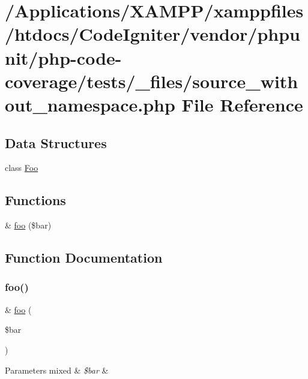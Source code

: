 \hypertarget{source__without__namespace_8php}{}\section{/\+Applications/\+X\+A\+M\+P\+P/xamppfiles/htdocs/\+Code\+Igniter/vendor/phpunit/php-\/code-\/coverage/tests/\+\_\+files/source\+\_\+without\+\_\+namespace.php File Reference}
\label{source__without__namespace_8php}
\subsection*{Data Structures}
\begin{DoxyCompactItemize}
\item 
class \mbox{\hyperlink{class_foo}{Foo}}
\end{DoxyCompactItemize}
\subsection*{Functions}
\begin{DoxyCompactItemize}
\item 
\& \mbox{\hyperlink{source__without__namespace_8php_ad7cf84e3c094f652ef0e0287d42393b1}{foo}} (\$bar)
\end{DoxyCompactItemize}


\subsection{Function Documentation}
\mbox{\label{source__without__namespace_8php_ad7cf84e3c094f652ef0e0287d42393b1}} 
\subsubsection{\texorpdfstring{foo()}{foo()}}
{\footnotesize\ttfamily \& \mbox{\hyperlink{interfacefoo}{foo}} (\begin{DoxyParamCaption}\item[{}]{\$bar }\end{DoxyParamCaption})}


\begin{DoxyParams}[1]{Parameters}
mixed & {\em \$bar} & \\
\hline
\end{DoxyParams}
